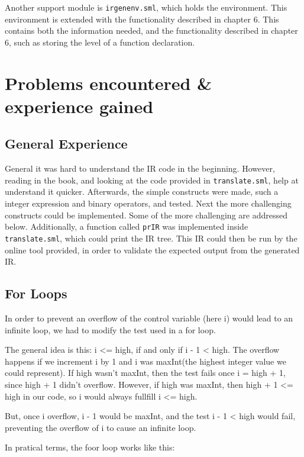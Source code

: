 \documentclass{article}
\begin{document}

Another support module is \texttt{irgenenv.sml}, which holds the environment. This environment is extended with the functionality described in chapter 6. This contains both the information needed, and the functionality described in chapter 6, such as storing the level of a function declaration.

\section{Problems encountered \& experience gained}

\subsection{General Experience}
General it was hard to understand the IR code in the beginning. However, reading in the book, and looking at the code provided in \texttt{translate.sml}, help at understand it quicker. Afterwards, the simple constructs were made, such a integer expression and binary operators, and tested. Next the more challenging constructs could be implemented. Some of the more challenging are addressed below. Additionally, a function called \texttt{prIR} was implemented inside \texttt{translate.sml}, which could print the IR tree. This IR could then be run by the online tool provided, in order to validate the expected output from the generated IR. 

\subsection{For Loops}
In order to prevent an overflow of the control variable (here i) would lead to an infinite loop, we had to modify the test used in a for loop.

The general idea is this: i <= high, if and only if i - 1 < high. The overflow happens if we increment i by 1 and i was maxInt(the highest integer value we could represent). If high wasn't maxInt, then the test fails once i = high + 1, since high + 1 didn't overflow. However, if high was maxInt, then high + 1 <= high in our code, so i would always fullfill i <= high.

But, once i overflow, i - 1 would be maxInt, and the test i - 1 < high would fail, preventing the overflow of i to cause an infinite loop.

In pratical terms, the foor loop works like this:
\end{document}
